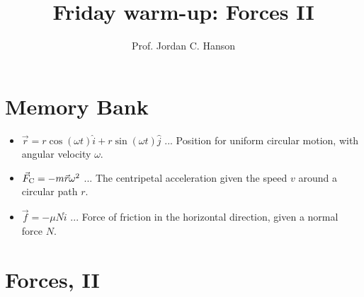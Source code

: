 \documentclass{article}
\begin{document}
\twocolumn

\title{Friday warm-up: Forces II}
\author{Prof. Jordan C. Hanson}

\maketitle

\section{Memory Bank}

\begin{itemize}
\item $\vec{r} = r\cos(\omega t)\hat{i} + r\sin(\omega t)\hat{j}$ ... Position for uniform circular motion, with angular velocity $\omega$.
\item $\vec{F}_{\rm C} = -m\vec{r}\omega^2$ ... The centripetal acceleration given the speed $v$ around a circular path $r$.
\item $\vec{f} = -\mu N \hat{i}$ ... Force of friction in the horizontal direction, given a normal force $N$.
\end{itemize}

\section{Forces, II}
\end{document}
